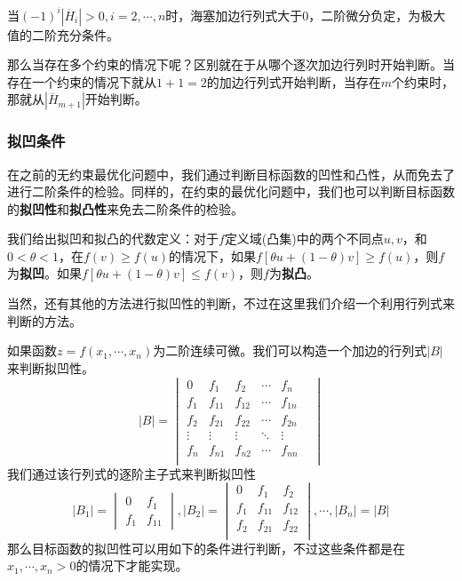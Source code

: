 \documentclass[UTF8,12pt]{ctexart}
\numberwithin{equation}{section} %
\numberwithin{figure}{section}
\numberwithin{table}{section}
\begin{document}
	当$(-1)^i|\overline{H}_i| > 0,i = 2,\cdots,n$时，海塞加边行列式大于0，二阶微分负定，为极大值的二阶充分条件。
	
	那么当存在多个约束的情况下呢？区别就在于从哪个逐次加边行列时开始判断。当存在一个约束的情况下就从$1+1=2$的加边行列式开始判断，当存在$m$个约束时，那就从$|\overline{H}_{m+1}|$开始判断。
	
	\subsubsection{拟凹条件}
	在之前的无约束最优化问题中，我们通过判断目标函数的凹性和凸性，从而免去了进行二阶条件的检验。同样的，在约束的最优化问题中，我们也可以判断目标函数的\textbf{拟凹性}和\textbf{拟凸性}来免去二阶条件的检验。
	
	我们给出拟凹和拟凸的代数定义：对于$f$定义域(凸集)中的两个不同点$u,v$，和$0<\theta<1$，在$f(v) \geqslant f(u)$的情况下，如果$f[\theta u + (1 - \theta) v] \geqslant f(u)$，则$f$为\textbf{拟凹}。如果$f[\theta u + (1 - \theta) v] \leqslant f(v)$，则$f$为\textbf{拟凸}。
	
	当然，还有其他的方法进行拟凹性的判断，不过在这里我们介绍一个利用行列式来判断的方法。
	
	如果函数$z = f(x_1,\cdots,x_n)$为二阶连续可微。我们可以构造一个加边的行列式$|B|$来判断拟凹性。
	\begin{equation}
		|B| = 
		\begin{vmatrix}
			0 & f_1 & f_2 & \cdots & f_n \\
			f_1 & f_{11} & f_{12} & \cdots & f_{1n} \\
			f_2 & f_{21} & f_{22} & \cdots & f_{2n} \\
			\vdots & \vdots &\vdots &\ddots &\vdots &\\
			f_n & f_{n1} & f_{n2} & \cdots & f_{nn} \\
		\end{vmatrix}
	\end{equation}
	我们通过该行列式的逐阶主子式来判断拟凹性
	\begin{equation}
		|B_1| =
		\begin{vmatrix}
			0 & f_1 \\
			f_1 & f_{11}
		\end{vmatrix},
		|B_2| = 
		\begin{vmatrix}
			0 & f_1 & f_2 \\
			f_1 & f_{11} & f_{12} \\
			f_2 & f_{21} & f_{22} \\
		\end{vmatrix},
		\cdots,
		|B_n| = |B|
	\end{equation}
	那么目标函数的拟凹性可以用如下的条件进行判断，不过这些条件都是在$x_1,\cdots,x_n > 0$的情况下才能实现。
	
\end{document}
